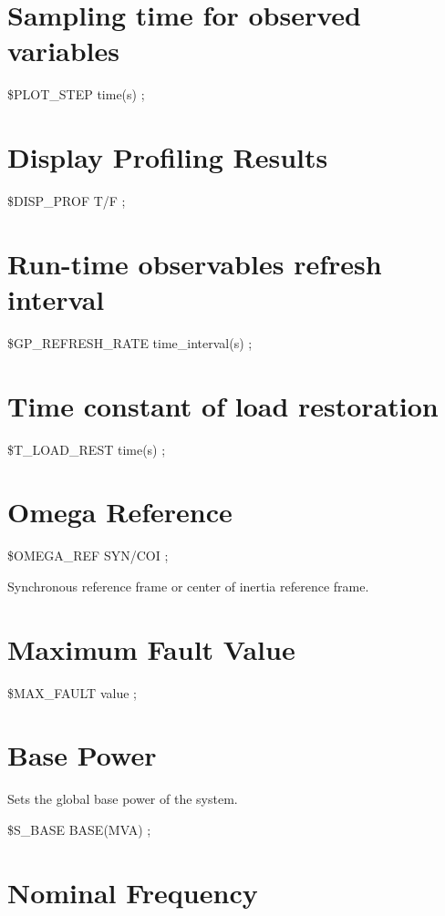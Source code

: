 \section{Sampling time for observed variables}

\$PLOT\_STEP time(s) ;

\section{Display Profiling Results}

\$DISP\_PROF T/F ; 

\section{Run-time observables refresh
	interval}

\$GP\_REFRESH\_RATE time\_interval(s) ; 


\section{Time constant of load restoration}

 \$T\_LOAD\_REST time(s) ; 


\section{Omega Reference}

 \$OMEGA\_REF SYN/COI ; 

Synchronous reference frame or center of inertia reference frame.


\section{Maximum Fault Value}

 \$MAX\_FAULT value ; 


\section{Base Power}

Sets the global base power of the system.

 \$S\_BASE BASE(MVA) ; 


\section{Nominal Frequency}

